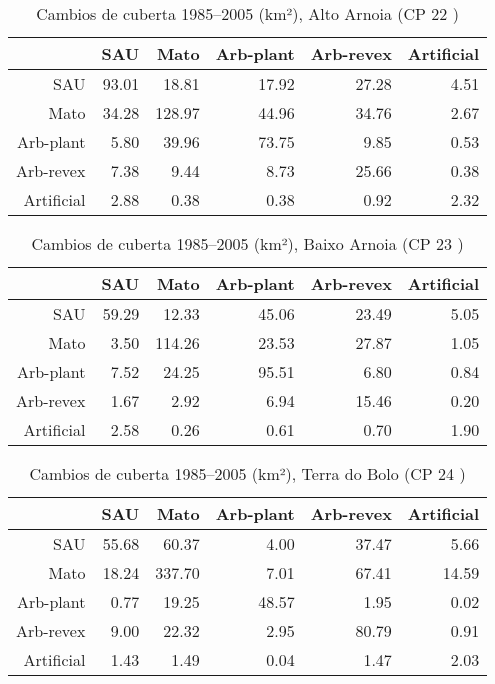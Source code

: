 \begin{table}[p]
\centering
\caption{Cambios de cuberta 1985--2005 (km²), Alto Arnoia (CP 22 )} 
\label{TaboaContinxCP22}
\begin{tabular}{rrrrrr}
  \hline
 & SAU & Mato & Arb-plant & Arb-revex & Artificial \\ 
  \hline
SAU & 93.01 & 18.81 & 17.92 & 27.28 & 4.51 \\ 
  Mato & 34.28 & 128.97 & 44.96 & 34.76 & 2.67 \\ 
  Arb-plant & 5.80 & 39.96 & 73.75 & 9.85 & 0.53 \\ 
  Arb-revex & 7.38 & 9.44 & 8.73 & 25.66 & 0.38 \\ 
  Artificial & 2.88 & 0.38 & 0.38 & 0.92 & 2.32 \\ 
   \hline
\end{tabular}
\end{table}
\begin{table}[p]
\centering
\caption{Cambios de cuberta 1985--2005 (km²), Baixo Arnoia (CP 23 )} 
\label{TaboaContinxCP23}
\begin{tabular}{rrrrrr}
  \hline
 & SAU & Mato & Arb-plant & Arb-revex & Artificial \\ 
  \hline
SAU & 59.29 & 12.33 & 45.06 & 23.49 & 5.05 \\ 
  Mato & 3.50 & 114.26 & 23.53 & 27.87 & 1.05 \\ 
  Arb-plant & 7.52 & 24.25 & 95.51 & 6.80 & 0.84 \\ 
  Arb-revex & 1.67 & 2.92 & 6.94 & 15.46 & 0.20 \\ 
  Artificial & 2.58 & 0.26 & 0.61 & 0.70 & 1.90 \\ 
   \hline
\end{tabular}
\end{table}
\begin{table}[p]
\centering
\caption{Cambios de cuberta 1985--2005 (km²), Terra do Bolo (CP 24 )} 
\label{TaboaContinxCP24}
\begin{tabular}{rrrrrr}
  \hline
 & SAU & Mato & Arb-plant & Arb-revex & Artificial \\ 
  \hline
SAU & 55.68 & 60.37 & 4.00 & 37.47 & 5.66 \\ 
  Mato & 18.24 & 337.70 & 7.01 & 67.41 & 14.59 \\ 
  Arb-plant & 0.77 & 19.25 & 48.57 & 1.95 & 0.02 \\ 
  Arb-revex & 9.00 & 22.32 & 2.95 & 80.79 & 0.91 \\ 
  Artificial & 1.43 & 1.49 & 0.04 & 1.47 & 2.03 \\ 
   \hline
\end{tabular}
\end{table}
